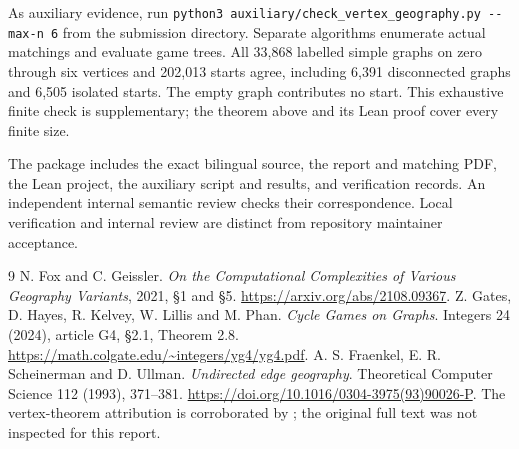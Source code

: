 \documentclass[10pt,letterpaper]{article}
\newcommand{\code}[1]{\texttt{\small #1}}
\begin{document}
As auxiliary evidence, run
\code{python3 auxiliary/check\_vertex\_geography.py -{}-max-n 6} from the submission
directory. Separate algorithms enumerate actual matchings and evaluate game
trees. All 33,868 labelled simple graphs on zero through six vertices and
202,013 starts agree, including 6,391 disconnected graphs and 6,505 isolated
starts. The empty graph contributes no start. This exhaustive finite check is
supplementary; the theorem above and its Lean proof cover every finite size.

The package includes the exact bilingual source, the report and matching PDF,
the Lean project, the auxiliary script and results, and verification records.
An independent internal semantic review checks their correspondence.
Local verification and internal review are distinct from repository maintainer
acceptance.

\begin{thebibliography}{9}\small
{} N. Fox and C. Geissler.
\emph{On the Computational Complexities of Various Geography Variants}, 2021,
\S1 and \S5. \url{https://arxiv.org/abs/2108.09367}.
 Z. Gates, D. Hayes, R. Kelvey, W. Lillis and M. Phan.
\emph{Cycle Games on Graphs}. Integers 24 (2024), article G4, \S2.1, Theorem 2.8.
\url{https://math.colgate.edu/~integers/yg4/yg4.pdf}.
 A. S. Fraenkel, E. R. Scheinerman and D. Ullman.
\emph{Undirected edge geography}. Theoretical Computer Science 112 (1993),
371--381. \url{https://doi.org/10.1016/0304-3975(93)90026-P}.
The vertex-theorem attribution is corroborated by \cite{gates}; the original
full text was not inspected for this report.
\end{thebibliography}
\end{document}
